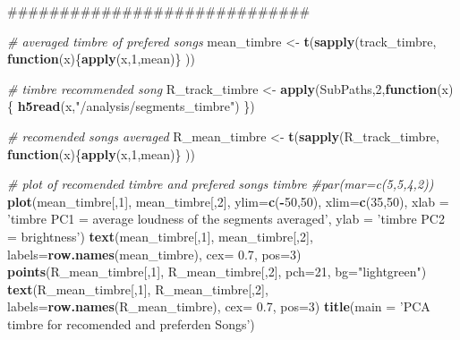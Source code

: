 \documentclass[]{article}
\newenvironment{Shaded}{\begin{snugshade}}{\end{snugshade}}
\newcommand{\KeywordTok}[1]{\textcolor[rgb]{0.13,0.29,0.53}{\textbf{#1}}}
\newcommand{\DataTypeTok}[1]{\textcolor[rgb]{0.13,0.29,0.53}{#1}}
\newcommand{\DecValTok}[1]{\textcolor[rgb]{0.00,0.00,0.81}{#1}}
\newcommand{\FloatTok}[1]{\textcolor[rgb]{0.00,0.00,0.81}{#1}}
\newcommand{\StringTok}[1]{\textcolor[rgb]{0.31,0.60,0.02}{#1}}
\newcommand{\CommentTok}[1]{\textcolor[rgb]{0.56,0.35,0.01}{\textit{#1}}}
\newcommand{\ControlFlowTok}[1]{\textcolor[rgb]{0.13,0.29,0.53}{\textbf{#1}}}
\newcommand{\OperatorTok}[1]{\textcolor[rgb]{0.81,0.36,0.00}{\textbf{#1}}}
\newcommand{\NormalTok}[1]{#1}
\begin{document}
\begin{Shaded}
\begin{Highlighting}[]
\NormalTok{#############################}

\CommentTok{# averaged timbre of prefered songs}
\NormalTok{mean_timbre <-}\StringTok{ }\KeywordTok{t}\NormalTok{(}\KeywordTok{sapply}\NormalTok{(track_timbre, }\ControlFlowTok{function}\NormalTok{(x)\{}\KeywordTok{apply}\NormalTok{(x,}\DecValTok{1}\NormalTok{,mean)\} ))}

\CommentTok{# timbre recommended song}
\NormalTok{R_track_timbre <-}\StringTok{ }\KeywordTok{apply}\NormalTok{(SubPaths,}\DecValTok{2}\NormalTok{,}\ControlFlowTok{function}\NormalTok{(x)\{}
  \KeywordTok{h5read}\NormalTok{(x,}\StringTok{"/analysis/segments_timbre"}\NormalTok{)}
\NormalTok{\})}

\CommentTok{# recomended songs averaged}
\NormalTok{R_mean_timbre <-}\StringTok{ }\KeywordTok{t}\NormalTok{(}\KeywordTok{sapply}\NormalTok{(R_track_timbre, }\ControlFlowTok{function}\NormalTok{(x)\{}\KeywordTok{apply}\NormalTok{(x,}\DecValTok{1}\NormalTok{,mean)\} ))}

\CommentTok{# plot of recomended timbre and prefered songs timbre}
\CommentTok{#par(mar=c(5,5,4,2))}
\KeywordTok{plot}\NormalTok{(mean_timbre[,}\DecValTok{1}\NormalTok{], mean_timbre[,}\DecValTok{2}\NormalTok{], }\DataTypeTok{ylim=}\KeywordTok{c}\NormalTok{(}\OperatorTok{-}\DecValTok{50}\NormalTok{,}\DecValTok{50}\NormalTok{), }\DataTypeTok{xlim=}\KeywordTok{c}\NormalTok{(}\DecValTok{35}\NormalTok{,}\DecValTok{50}\NormalTok{), }\DataTypeTok{xlab =} \StringTok{'timbre PC1 =  average loudness of the segments averaged'}\NormalTok{, }\DataTypeTok{ylab =} \StringTok{'timbre PC2 = brightness'}\NormalTok{)}
\KeywordTok{text}\NormalTok{(mean_timbre[,}\DecValTok{1}\NormalTok{], mean_timbre[,}\DecValTok{2}\NormalTok{], }\DataTypeTok{labels=}\KeywordTok{row.names}\NormalTok{(mean_timbre), }\DataTypeTok{cex=} \FloatTok{0.7}\NormalTok{, }\DataTypeTok{pos=}\DecValTok{3}\NormalTok{)}
\KeywordTok{points}\NormalTok{(R_mean_timbre[,}\DecValTok{1}\NormalTok{], R_mean_timbre[,}\DecValTok{2}\NormalTok{], }\DataTypeTok{pch=}\DecValTok{21}\NormalTok{,  }\DataTypeTok{bg=}\StringTok{"lightgreen"}\NormalTok{)}
\KeywordTok{text}\NormalTok{(R_mean_timbre[,}\DecValTok{1}\NormalTok{], R_mean_timbre[,}\DecValTok{2}\NormalTok{], }\DataTypeTok{labels=}\KeywordTok{row.names}\NormalTok{(R_mean_timbre), }\DataTypeTok{cex=} \FloatTok{0.7}\NormalTok{, }\DataTypeTok{pos=}\DecValTok{3}\NormalTok{)}
\KeywordTok{title}\NormalTok{(}\DataTypeTok{main =} \StringTok{'PCA timbre for recomended and preferden Songs'}\NormalTok{)}
\end{Highlighting}
\end{Shaded}
\end{document}
